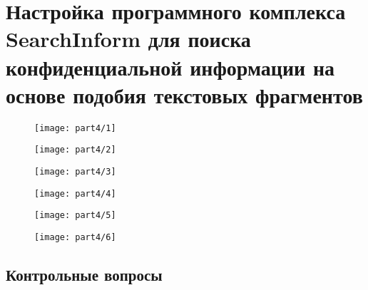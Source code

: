 \section{Настройка программного комплекса SearchInform для поиска
конфиденциальной информации на основе подобия текстовых фрагментов }

\begin{figure}[H]
  \centering
  \texttt{[image: part4/1]}
\end{figure}

\begin{figure}[H]
  \centering
  \texttt{[image: part4/2]}
\end{figure}

\begin{figure}[H]
  \centering
  \texttt{[image: part4/3]}
\end{figure}

\begin{figure}[H]
  \centering
  \texttt{[image: part4/4]}
\end{figure}

\begin{figure}[H]
  \centering
  \texttt{[image: part4/5]}
\end{figure}

\begin{figure}[H]
  \centering
  \texttt{[image: part4/6]}
\end{figure}

\subsection{Контрольные вопросы}

